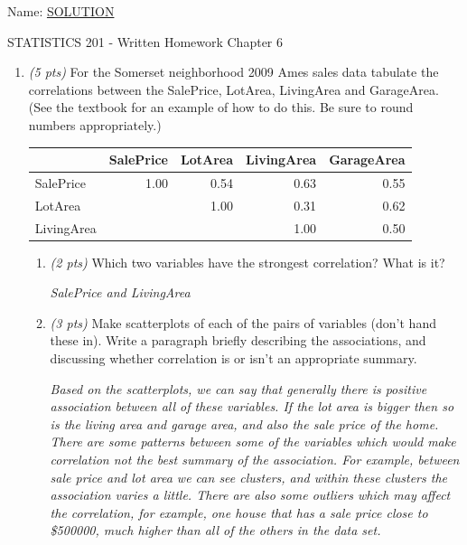 \documentclass{article}
\begin{document}
\hspace{2in} Name: \underline{SOLUTION}\\

\begin{center}
{\large STATISTICS 201 - Written Homework Chapter 6}\\[3mm]


\end{center}

\begin{enumerate}
\item {\em (5 pts)} For the Somerset neighborhood 2009 Ames sales data tabulate the correlations between the SalePrice, LotArea, LivingArea and GarageArea. (See the textbook for an example of how to do this. Be sure to round numbers appropriately.)


\begin{tabular}{l|rrrr}
 & SalePrice & LotArea & LivingArea & GarageArea \\\hline
SalePrice & 1.00 & 0.54 & 0.63 & 0.55 \\
LotArea & & 1.00 & 0.31 & 0.62 \\
LivingArea & & & 1.00 & 0.50 \\
\end{tabular}

\begin{enumerate}
\item {\em (2 pts)} Which two variables have the strongest correlation? What is it?

{\em SalePrice and LivingArea}

\item {\em (3 pts)} Make scatterplots of each of the pairs of variables (don't hand these in). Write a paragraph briefly describing the associations, and discussing whether correlation is  or isn't an appropriate summary.

{\em Based on the scatterplots, we can say that generally there is positive association between all of these variables. If the lot area is bigger then so is the living area and garage area, and also the sale price of the home. There are some patterns between some of the variables which would make correlation not the best summary of the association. For example, between sale price and lot area we can see clusters, and within these clusters the association varies a little. There are also some outliers which may affect the correlation, for example, one house that has a sale price close to \$500000, much higher than all of the others in the data set. }


\end{enumerate}
\end{enumerate}
\end{document}
